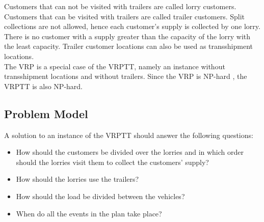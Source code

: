Customers that can not be visited with trailers are called lorry customers. Customers that can be visited with trailers are called trailer customers. Split collections are not allowed, hence each customer's supply is collected by one lorry.
There is no customer with a supply greater than the capacity of the lorry with the least capacity.
Trailer customer locations can also be used as transshipment locations. \\



The VRP is a special case of the VRPTT, namely an instance without transshipment locations and without trailers. Since the VRP is NP-hard \cite{laporte2009fifty}, the VRPTT is also NP-hard.



\subsection{Problem Model}


A solution to an instance of the VRPTT should answer the following questions:

\begin{itemize}
\item How should the customers be divided over the lorries and in which order should the lorries visit them to collect the customers' supply?
\item How should the lorries use the trailers?
\item How should the load be divided between the vehicles?
\item When do all the events in the plan take place?
\end{itemize}


